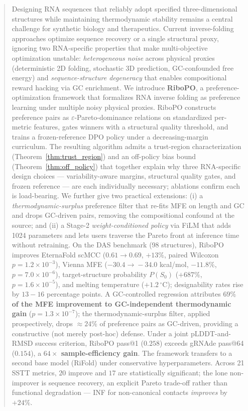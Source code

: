 

\begin{abstract}
Designing RNA sequences that reliably adopt specified three-dimensional structures while maintaining thermodynamic stability remains a central challenge for synthetic biology and therapeutics. Current inverse-folding approaches optimize sequence recovery or a single structural proxy, ignoring two RNA-specific properties that make multi-objective optimization unstable: \emph{heterogeneous noise} across physical proxies (deterministic 2D folding, stochastic 3D prediction, GC-confounded free energy) and \emph{sequence-structure degeneracy} that enables compositional reward hacking via GC enrichment.
We introduce \textbf{RiboPO}, a preference-optimization framework that formalizes RNA inverse folding as preference learning under multiple noisy physical proxies. RiboPO constructs preference pairs as $\varepsilon$-Pareto-dominance relations on standardized per-metric features, gates winners with a structural quality threshold, and trains a frozen-reference DPO policy under a decreasing-margin curriculum. The resulting algorithm admits a trust-region characterization (Theorem~\ref{thm:trust_region}) and an off-policy bias bound (Theorem~\ref{thm:off_policy}) that together explain why three RNA-specific design choices --- variability-aware margins, structural quality gates, and frozen reference --- are each individually necessary; ablations confirm each is load-bearing. We further give two practical extensions: (i) a \emph{thermodynamic-surplus} preference filter that re-fits MFE on length and GC and drops GC-driven pairs, removing the compositional confound at the source; and (ii) a Stage-2 \emph{weight-conditioned policy} via FiLM that adds 1024 parameters and lets users traverse the Pareto front at inference time without retraining.
On the DAS benchmark (98 structures), RiboPO improves EternaFold scMCC ($0.61\!\to\!0.69$, $+13\%$, paired Wilcoxon $p{=}1.2\!\times\!10^{-3}$), Vienna MFE ($-30.4\!\to\!-34.0$ kcal/mol, $-11.8\%$, $p{=}7.0\!\times\!10^{-6}$), target-structure probability $P(S_0)$ (\textbf{$+687\%$}, $p{=}1.6\!\times\!10^{-5}$), and melting temperature ($+1.2\,^\circ$C); designability rates rise by $13\!-\!16$ percentage points. A GC-controlled regression attributes \textbf{$69\%$ of the MFE improvement to GC-independent thermodynamic gain} ($p{=}1.3\!\times\!10^{-7}$); the thermodynamic-surplus filter, applied prospectively, drops $\approx 24\%$ of preference pairs as GC-driven, providing a constructive (not merely post-hoc) defense. Under a joint pLDDT-and-RMSD success criterion, RiboPO pass@1 ($0.258$) exceeds gRNAde pass@64 ($0.154$), a \textbf{$64\times$ sample-efficiency gain}. The framework transfers to a second base model (RiFold) under conservative hyperparameters. Across 21 SSTT metrics, $20$ improve and $17$ are statistically significant; the lone non-improver is sequence recovery, an explicit Pareto trade-off rather than functional degradation --- INF for non-canonical contacts \emph{improves} by $+24\%$.
\end{abstract}
